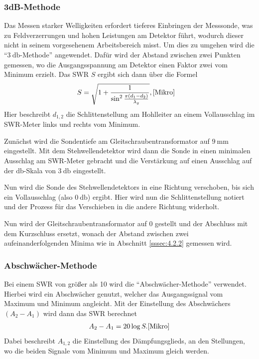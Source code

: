             \subsubsection{3dB-Methode}
                Das Messen starker Welligkeiten erfordert tieferes Einbringen der Messsonde, was zu Feldverzerrungen und hohen Leistungen am Detektor führt, wodurch dieser
                nicht in seinem vorgesehenem Arbeitsbereich misst.
                Um dies zu umgehen wird die \enquote{$\SI{3}{\decibel}$-Methode} angewendet.
                Dafür wird der Abstand zwischen zwei Punkten gemessen, wo die Ausgangsspannung am Detektor 
                einen Faktor zwei vom Minimum erzielt. Das SWR $S$ ergibt sich dann über die Formel
                \begin{align}
                    S &= \sqrt{1+\frac{1}{\sin ^2 \frac{\pi (d_1-d_2)}{\lambda_g}}} \label{eq:2}, \text{\cite{Mikro}}
                \end{align}
                Hier beschreibt $d_{1,2}$ die Schlittenstellung am Hohlleiter an einem Vollausschlag im SWR-Meter links und rechts vom Minimum.
            
                Zunächst wird die Sondentiefe am Gleitschraubentransformator auf $\SI{9}{\milli\metre}$ eingestellt.
                Mit dem Stehwellendetektor wird dann die Sonde in einen minimalen Ausschlag am SWR-Meter gebracht und die Verstärkung auf einen Ausschlag auf der $\si{\decibel}$-Skala von $\SI{3}{\decibel}$ eingestellt.
                
                Nun wird die Sonde des Stehwellendetektors in eine Richtung verschoben, bis sich ein Vollausschlag (also $\SI{0}{\decibel}$) ergibt.
                Hier wird nun die Schlittenstellung notiert und der Prozess für das Verschieben in die andere Richtung widerholt.

                Nun wird der Gleitschraubentransformator auf 0 gestellt und der Abschluss mit dem Kurzschluss ersetzt, wonach der Abstand zwischen zwei aufeinanderfolgenden Minima wie in Abschnitt \ref{sssec:4.2.2} gemessen wird.
                
            \subsubsection{Abschwächer-Methode}
                Bei einem SWR von größer als 10 wird die \enquote{Abschwächer-Methode} verwendet.
                Hierbei wird ein Abschwächer genutzt, welcher das Ausgangssignal vom Maximum und Minimum angleicht. 
                Mit der Einstellung des Abschwächers $(A_2-A_1) $ wird dann das SWR berechnet
                \begin{align}
                    A_2-A_1 = 20 \log S \label{eq:3}. \text{\cite{Mikro}}
                \end{align}
                Dabei beschreibt $A_{1,2}$ die Einstellung des Dämpfungsglieds, an den Stellungen, wo die beiden Signale vom Minimum und Maximum gleich werden.
            

